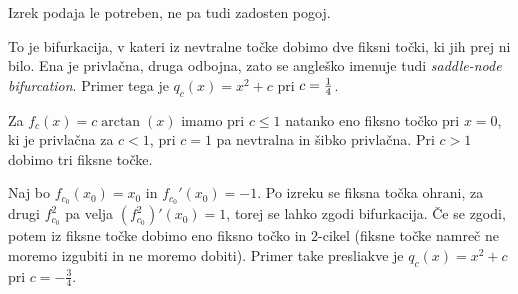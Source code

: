 \begin{opomba}
  Izrek podaja le potreben, ne pa tudi zadosten pogoj.
\end{opomba}

\begin{primer}
  To je bifurkacija, v kateri iz nevtralne točke dobimo dve fiksni točki, ki jih
  prej ni bilo.
  Ena je privlačna, druga odbojna, zato se angleško imenuje tudi
  \textit{saddle-node bifurcation}.
  Primer tega je $q_c(x) = x^2 + c$ pri $c = \frac{1}{4}$.
\end{primer}

\begin{primer}
  Za $f_c(x) = c \arctan(x)$ imamo pri $c \le 1$ natanko eno fiksno točko pri $x
  = 0$, ki je privlačna za $c < 1$, pri $c = 1$ pa nevtralna in šibko privlačna.
  Pri $c > 1$ dobimo tri fiksne točke.
\end{primer}

\begin{primer}
  Naj bo $f_{c_0}(x_0) = x_0$ in $f_{c_0}'(x_0) = -1$.
  Po izreku se fiksna točka ohrani, za drugi $f_{c_0}^2$ pa velja
  $(f_{c_0}^2)'(x_0) = 1$, torej se lahko zgodi bifurkacija.
  Če se zgodi, potem iz fiksne točke dobimo eno fiksno točko in $2$-cikel
  (fiksne točke namreč ne moremo izgubiti in ne moremo dobiti).
  Primer take presliakve je $q_c(x) = x^2 + c$ pri $c = -\frac{3}{4}$.
\end{primer}

